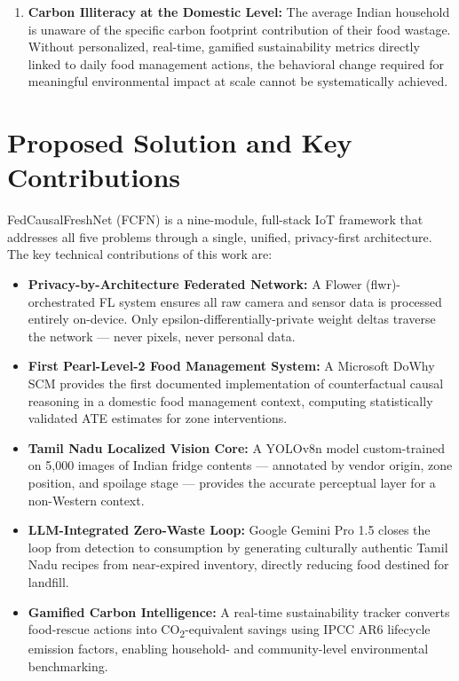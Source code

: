 \documentclass[12pt,a4paper]{report}
\begin{document}
\begin{enumerate}[leftmargin=2em, itemsep=0.3em]
\item \textbf{Carbon Illiteracy at the Domestic Level:} The average Indian household is unaware of the specific carbon footprint contribution of their food wastage. Without personalized, real-time, gamified sustainability metrics directly linked to daily food management actions, the behavioral change required for meaningful environmental impact at scale cannot be systematically achieved.

\end{enumerate}

\section{Proposed Solution and Key Contributions}

FedCausalFreshNet (FCFN) is a nine-module, full-stack IoT framework that addresses all five problems through a single, unified, privacy-first architecture. The key technical contributions of this work are:

\begin{itemize}[leftmargin=2em, itemsep=0.3em]
    \item \textbf{Privacy-by-Architecture Federated Network:} A Flower (flwr)-orchestrated FL system ensures all raw camera and sensor data is processed entirely on-device. Only epsilon-differentially-private weight deltas traverse the network — never pixels, never personal data.
    \item \textbf{First Pearl-Level-2 Food Management System:} A Microsoft DoWhy SCM provides the first documented implementation of counterfactual causal reasoning in a domestic food management context, computing statistically validated ATE estimates for zone interventions.
    \item \textbf{Tamil Nadu Localized Vision Core:} A YOLOv8n model custom-trained on 5,000 images of Indian fridge contents — annotated by vendor origin, zone position, and spoilage stage — provides the accurate perceptual layer for a non-Western context.
    \item \textbf{LLM-Integrated Zero-Waste Loop:} Google Gemini Pro 1.5 closes the loop from detection to consumption by generating culturally authentic Tamil Nadu recipes from near-expired inventory, directly reducing food destined for landfill.
    \item \textbf{Gamified Carbon Intelligence:} A real-time sustainability tracker converts food-rescue actions into CO\textsubscript{2}-equivalent savings using IPCC AR6 lifecycle emission factors, enabling household- and community-level environmental benchmarking.
\end{itemize}
\end{document}
